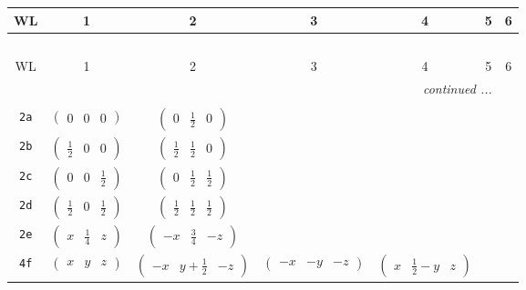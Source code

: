 \documentclass[fleqn,9pt,landscape]{jsarticle}
\begin{document}
\begin{center}
\renewcommand{\arraystretch}{1.2}
\begin{longtable}{ccccccc}
 \hline \hline
WL & 1 & 2 & 3 & 4 & 5 & 6 \\ \hline \endfirsthead

\multicolumn{6}{l}{\tablename\ \thetable{}} \\
 \hline \hline
WL & 1 & 2 & 3 & 4 & 5 & 6 \\ \hline \endhead

 \hline \hline
\multicolumn{6}{r}{\footnotesize\it continued ...} \\ \endfoot

 \hline \hline
\multicolumn{6}{r}{} \\ \endlastfoot

{\tt 2a} & $ \begin{pmatrix} 0 & 0 & 0 \end{pmatrix} $ & $ \begin{pmatrix} 0 & \frac{1}{2} & 0 \end{pmatrix} $ & $  $ & $  $ \\ \hline
{\tt 2b} & $ \begin{pmatrix} \frac{1}{2} & 0 & 0 \end{pmatrix} $ & $ \begin{pmatrix} \frac{1}{2} & \frac{1}{2} & 0 \end{pmatrix} $ & $  $ & $  $ \\ \hline
{\tt 2c} & $ \begin{pmatrix} 0 & 0 & \frac{1}{2} \end{pmatrix} $ & $ \begin{pmatrix} 0 & \frac{1}{2} & \frac{1}{2} \end{pmatrix} $ & $  $ & $  $ \\ \hline
{\tt 2d} & $ \begin{pmatrix} \frac{1}{2} & 0 & \frac{1}{2} \end{pmatrix} $ & $ \begin{pmatrix} \frac{1}{2} & \frac{1}{2} & \frac{1}{2} \end{pmatrix} $ & $  $ & $  $ \\ \hline
{\tt 2e} & $ \begin{pmatrix} x & \frac{1}{4} & z \end{pmatrix} $ & $ \begin{pmatrix} - x & \frac{3}{4} & - z \end{pmatrix} $ & $  $ & $  $ \\ \hline
{\tt 4f} & $ \begin{pmatrix} x & y & z \end{pmatrix} $ & $ \begin{pmatrix} - x & y + \frac{1}{2} & - z \end{pmatrix} $ & $ \begin{pmatrix} - x & - y & - z \end{pmatrix} $ & $ \begin{pmatrix} x & \frac{1}{2} - y & z \end{pmatrix} $ \\
\end{longtable}
\end{center}
\end{document}
